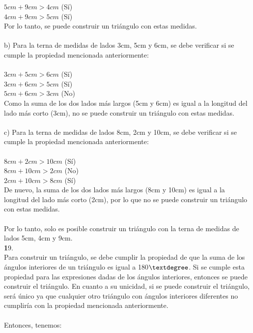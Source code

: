 \documentclass{article}
\begin{document}
$5cm + 9cm > 4cm$ (Sí)\\
$4cm + 9cm > 5cm$ (Sí)\\
Por lo tanto, se puede construir un triángulo con estas medidas.\\
\\
b) Para la terna de medidas de lados 3cm, 5cm y 6cm, se debe verificar si se cumple la propiedad mencionada anteriormente:\\
\\
$3cm + 5cm > 6cm$ (Sí)\\
$3cm + 6cm > 5cm$ (Sí)\\
$5cm + 6cm > 3cm$ (No)\\
Como la suma de los dos lados más largos (5cm y 6cm) es igual a la longitud del lado más corto (3cm), no se puede construir un triángulo con estas medidas.\\
\\
c) Para la terna de medidas de lados 8cm, 2cm y 10cm, se debe verificar si se cumple la propiedad mencionada anteriormente:\\
\\
$8cm + 2cm > 10cm$ (Sí)\\
$8cm + 10cm > 2cm$ (No)\\
$2cm + 10cm > 8cm$ (Sí)\\
De nuevo, la suma de los dos lados más largos (8cm y 10cm) es igual a la longitud del lado más corto (2cm), por lo que no se puede construir un triángulo con estas medidas.\\
\\
Por lo tanto, solo es posible construir un triángulo con la terna de medidas de lados 5cm, 4cm y 9cm.\\
{\textbf 19. }\\
Para construir un triángulo, se debe cumplir la propiedad de que la suma de los ángulos interiores de un triángulo es igual a 180$\textdegree$. Si se cumple esta propiedad para las expresiones dadas de los ángulos interiores, entonces se puede construir el triángulo. En cuanto a su unicidad, si se puede construir el triángulo, será único ya que cualquier otro triángulo con ángulos interiores diferentes no cumpliría con la propiedad mencionada anteriormente.\\
\\
Entonces, tenemos:\\
\\
\end{document}
